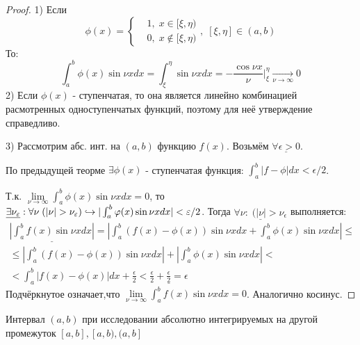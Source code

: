 \documentclass{article}
\begin{document}
\begin{proof}
  1) Если 
  \[
    \phi(x) = \left\{\begin{aligned}
      & 1, \; x \in[\xi,\eta) \\ 
      & 0, \; x \notin [\xi,\eta)
    \end{aligned}\right. ,\; [\xi,\eta] \in (a,b)
  \]
  То:
  \[
    \int_{a}^{b}\phi(x)\sin\nu xdx=\int_{\xi}^{\eta}\sin\nu xdx=
    -\frac{\cos \nu x}{\nu}\bigg|_\xi^{\eta} \underset{\nu\to\infty}{\to}0
  \]
  2) Если $\phi(x)$ - ступенчатая, то она является линейно комбинацией
  расмотренных одноступенчатых функций, поэтому для неё утверждение справедливо.

  3) Рассмотрим абс. инт. на $(a,b)$ функцию $f(x)$. Возьмём $ \underline{\forall\epsilon>0}$.

  По предыдущей теорме $\exists \phi(x)$ - ступенчатая функция: $\int_{a}^{b}|f-\phi|dx<\epsilon/2$.

  Т.к. $\lim\limits_{\nu\to \infty }\int_{a}^{b}\phi(x)\sin\nu x dx =0 $, то
  $\underline{\exists \nu_\epsilon }: \forall \nu \; (|\nu|>\nu_\epsilon) \true |\int_{a}^{b}\phi(x)\sin \nu x dx|<\epsilon/2$.
  Тогда $\underline{\forall \nu : \;(|\nu|>\nu_\epsilon}$ выполняется:
  \begin{gather*}
    \underline{|\int_{a}^{b}f(x)\sin\nu x dx|}=|\int_{a}^{b}(f(x)-\phi(x))\sin \nu x dx + \int_{a}^{b}\phi(x)\sin \nu xdx|\le  \\
    \le|\int_{a}^{b}(f(x)-\phi(x))\sin \nu xdx|+|\int_{a}^{b}\phi(x)\sin \nu xdx| < \\
    <\int_{a}^{b}|f(x)-\phi(x)|dx + \frac{\epsilon}{2} < \underline{\frac{\epsilon}{2}+\frac{\epsilon}{2}=\epsilon}
  \end{gather*}
  Подчёркнутое означает,что $\lim\limits_{\nu\to\infty}\int_{a}^{b}f(x)\sin \nu xdx=0$. Аналогично косинус.
\end{proof}
\begin{remark}
  Интервал $(a,b)$ при исследовании абсолютно интегрируемых
  на другой промежуток $[a,b],[a,b),(a,b]$
\end{remark}

\end{document}
